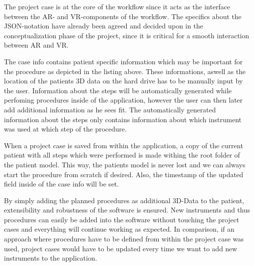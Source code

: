 The project case is at the core of the workflow since it acts as the interface between the AR- and VR-components of the workflow.
The specifics about the JSON-notation have already been agreed and decided upon in the conceptualization phase of the project, since it is critical for a smooth interaction between AR and VR. 

The case info contains patient specific information which may be important for the procedure as depicted in the listing above.
These informations, aswell as the location of the patients 3D data on the hard drive has to be manually input by the user.
Information about the steps will be automatically generated while perfoming procedures inside of the application, however the user can then later add additional information as he sees fit.
The automatically generated information about the steps only contains information about which instrument was used at which step of the procedure.

When a project case is saved from within the application, a copy of the current patient with all steps which were performed is made withing the root folder of the patient model.
This way, the patients model is never lost and we can always start the procedure from scratch if desired.
Also, the timestamp of the updated field inside of the case info will be set.

By simply adding the planned procedures as additional 3D-Data to the patient, extensibility and robustness of the software is ensured.
New instruments and thus procedures can easily be added into the software without touching the project cases and everything will continue working as expected.
In comparison, if an approach where procedures have to be defined from within the project case was used, project cases would have to be updated every time we want to add new instruments to the application.